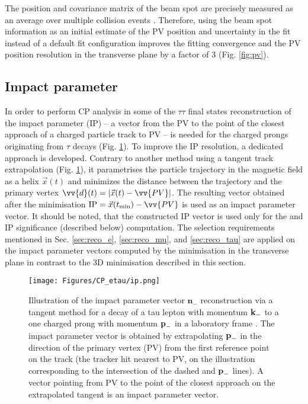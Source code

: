 The position and covariance matrix of the beam spot are precisely measured as an average over multiple collision events \cite{CMS:2014pgm}. Therefore, using the beam spot information as an initial estimate of the PV position and uncertainty in the fit instead of a default fit configuration improves the fitting convergence and the PV position resolution in the transverse plane by a factor of 3 (Fig. \ref{fig:pv}). 

\subsection{Impact parameter}\label{sec:ip}

In order to perform CP analysis in some of the $\tau\tau$ final states reconstruction of the impact parameter (IP) -- a vector from the PV to the point of the closest approach of a charged particle track to PV -- is needed for the charged prongs originating from $\tau$ decays  (Fig. \ref{fig:ip}). To improve the IP resolution, a dedicated approach is developed. Contrary to another method using a tangent track extrapolation (Fig. \ref{fig:ip}), it parametrises the particle trajectory in the magnetic field as a helix $\vec{x}(t)$ and minimizes the distance between the trajectory and the primary vertex $\vv{d}(t) = |\vec{x}(t) - \vv{PV}|$. The resulting vector obtained after the minimisation $\text{IP} = \vec{x}(t_{\text{min}}) - \vv{PV}$ is used as an impact parameter vector. It should be noted, that the constructed IP vector is used only for the \phicp and IP significance (described below) computation. The selection requirements mentioned in Sec. \ref{sec:reco_e}, \ref{sec:reco_mu}, and \ref{sec:reco_tau} are applied on the impact parameter vectors computed by the minimisation in the transverse plane in contrast to the 3D minimisation described in this section.

\begin{figure}[t!]
    \centering
    \texttt{[image: Figures/CP\_etau/ip.png]}
    \caption{Illustration of the impact parameter vector $\boldsymbol{n}_-$ reconstruction via a tangent method for a decay of a tau lepton with momentum $\text{\textbf{k}}_-$ to a one charged prong with momentum $\text{\textbf{p}}_-$ in a laboratory frame \cite{Berge:2008dr}. The impact parameter vector is obtained by extrapolating $\text{\textbf{p}}_-$ in the direction of the primary vertex (PV) from the first reference point on the track (the tracker hit nearest to PV, on the illustration corresponding to the intersection of the dashed and $\text{\textbf{p}}_-$ lines). A vector pointing from PV to the point of the closest approach on the extrapolated tangent is an impact parameter vector.}
    \label{fig:ip}
\end{figure}


